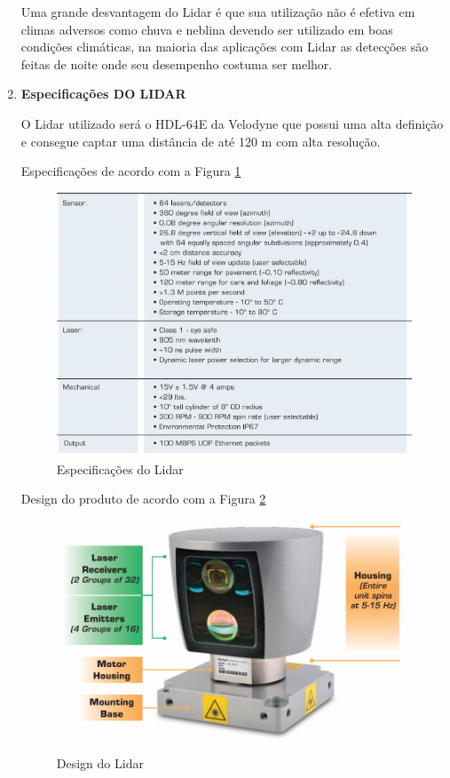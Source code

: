 \begin{enumerate}
	Uma grande desvantagem do Lidar é que sua utilização não é efetiva em
  climas adversos como chuva e neblina devendo ser utilizado em boas condições
  climáticas, na maioria das aplicações com Lidar as detecções são feitas
  de noite onde seu desempenho costuma ser melhor.

\item \textbf{Especificações DO LIDAR}

O Lidar utilizado será o HDL-64E da Velodyne que possui uma alta definição e consegue captar uma distância de até 120 m com alta resolução.

Especificações de acordo com a Figura \ref{fig:especificacoes_lidar}

\begin{figure}[h]
  \centering
  \includegraphics[width=400px, scale=1]{figuras/especificacoes_lidar}
  \caption{Especificações do Lidar}
\label{fig:especificacoes_lidar}
\end{figure}

Design do produto de acordo com a Figura \ref{fig:design_lidar}

\begin{figure}[h]
  \centering
  \includegraphics[width=400px, scale=1]{figuras/design_lidar}
  \caption{Design do Lidar}
\label{fig:design_lidar}
\end{figure}
\end{enumerate}

